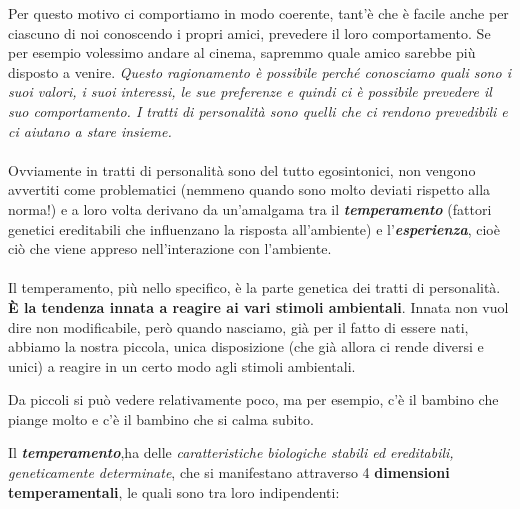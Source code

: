 Per questo motivo ci comportiamo in modo coerente, tant'è che è facile
anche per ciascuno di noi conoscendo i propri amici, prevedere il loro
comportamento. Se per esempio volessimo andare al cinema, sapremmo quale
amico sarebbe più disposto a venire. \emph{\emph{Questo ragionamento è
possibile perché conosciamo quali sono i suoi valori, i suoi interessi,
le sue preferenze e quindi ci è possibile prevedere il suo
comportamento. I tratti di personalità sono quelli che ci rendono
prevedibili e ci aiutano a stare insieme. }}
\\\\
Ovviamente in tratti di personalità sono del tutto egosintonici, non
vengono avvertiti come problematici (nemmeno quando sono molto deviati
rispetto alla norma!) e a loro volta derivano da un'amalgama tra il
\textbf{\emph{temperamento}} (fattori genetici ereditabili che
influenzano la risposta all'ambiente) e l'\textbf{\emph{esperienza}},
cioè ciò che viene appreso nell'interazione con l'ambiente.
\\\\
Il temperamento, più nello specifico, è la parte genetica dei tratti di
personalità. \textbf{È la tendenza innata a reagire ai vari stimoli
ambientali}. Innata non vuol dire non modificabile, però quando
nasciamo, già per il fatto di essere nati, abbiamo la nostra piccola,
unica disposizione (che già allora ci rende diversi e unici) a reagire
in un certo modo agli stimoli ambientali.

Da piccoli si può vedere relativamente poco, ma per esempio, c'è il
bambino che piange molto e c'è il bambino che si calma subito.

Il \textbf{\emph{temperamento}},ha delle \emph{caratteristiche
biologiche stabili ed ereditabili, geneticamente determinate}, che si
manifestano attraverso 4 \textbf{dimensioni temperamentali}, le quali
sono tra loro indipendenti:

